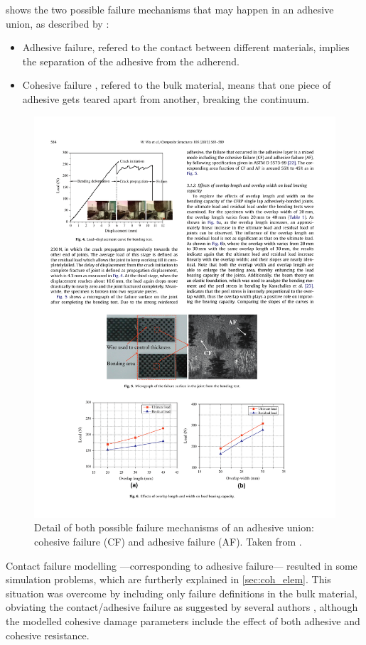 \documentclass[cmfonts]{witpress}
\begin{document}
 shows the two possible failure mechanisms that may happen in an adhesive union, as described by \cite{Wu2013}:
\begin{itemize}
	\item Adhesive failure, refered to the contact between different materials, implies the separation of the adhesive from the adherend.

	\item Cohesive failure \cite{Vaidya2006}, refered to the bulk material, means that one piece of adhesive gets teared apart from another, breaking the continuum.
\end{itemize}

\begin{figure}
	\centering
	\includegraphics[width=0.7\linewidth]{figures/IMG_CUTRES/Wu_failure_systems}
	\caption[Detail of both possible failure mechanisms of an adhesive union: cohesive failure and adhesive failure.]{Detail of both possible failure mechanisms of an adhesive union: cohesive failure (CF) and adhesive failure (AF). Taken from \cite{Wu2013}.}
	\label{fig:Wu_failure_systems}
\end{figure}

Contact failure modelling ---corresponding to adhesive failure--- resulted in some simulation problems, which are furtherly explained in \cref{sec:coh_elem}. This situation was overcome by including only failure definitions in the bulk material, obviating the contact/adhesive failure as suggested by several authors \cite{Greve2007, Loureiro2010, Sadowski2010, Sadowski2011, Scattina2011, Sadowski2014, SernaMoreno2015}, although the modelled cohesive damage parameters include the effect of both adhesive and cohesive resistance.
\end{document}
